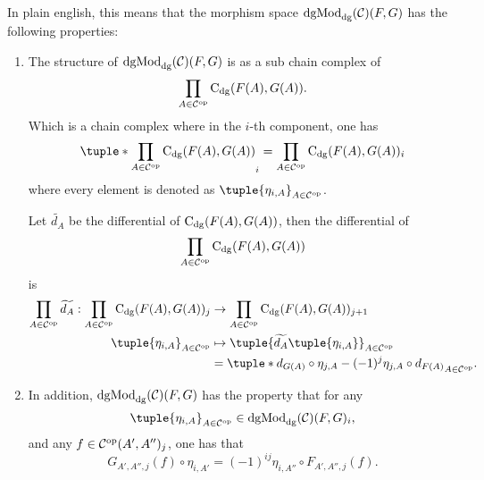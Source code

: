 In plain english, this means that the morphism space \( \operatorname{dgMod}_{\operatorname{dg}}({\mathcal{C}})(F, G) \) has the following properties:
\begin{enumerate}
    \item {
        The structure of \( \operatorname{dgMod}_{\operatorname{dg}}({\mathcal{C}})(F, G) \) is as a sub chain complex of
        \[
            \prod_{A \in {\mathcal{C}}^{\operatorname{op}}} \operatorname{C}_{\operatorname{dg}}(F(A), G(A)).
        \]
        Which is a chain complex where in the \( i \)-th component, one has
        \[
            \tuple*{ \prod_{A \in \Cc^{\op}} \C_{\dg}(F(A), G(A)) }_i = \prod_{A \in \Cc^{\op}} \C_{\dg}(F(A), G(A))_i
        \]
        where every element is denoted as \( \tuple{ \eta_{i, A} }_{A \in \Cc^{\op}} \).

        Let \( \widetilde{d_A} \) be the differential of \( \operatorname{C}_{\operatorname{dg}}(F(A), G(A)) \), then the differential of
        \[
            \prod_{A \in {\mathcal{C}}^{\operatorname{op}}} \operatorname{C}_{\operatorname{dg}}(F(A), G(A))
        \]
        is
        \begin{align*}
            \prod_{A \in \Cc^{\op}} \widetilde{d_A} : \prod_{A \in \Cc^{\op}} \C_{\dg}(F(A), G(A))_j &\to \prod_{A \in \Cc^{\op}} \C_{\dg}(F(A), G(A))_{j + 1} \\
            \tuple{ \eta_{i, A} }_{A \in \Cc^{\op}} &\mapsto \tuple{ \widetilde{d_A}\tuple{ \eta_{i, A} } }_{A \in \Cc^{\op}} \\
            &= \tuple*{ d_{G(A)} \circ \eta_{j, A} - (-1)^j \eta_{j, A} \circ d_{F(A)} }_{A \in \Cc^{\op}}.
        \end{align*}
    }
    \item {
        In addition, \( \operatorname{dgMod}_{\operatorname{dg}}({\mathcal{C}})(F, G) \) has the property that for any
        \[
            \tuple{ \eta_{i, A} }_{A \in \Cc^{\op}} \in \dgMod_{\dg}(\Cc)(F, G)_i,
        \]
        and any \( f \in {\mathcal{C}}^{\operatorname{op}}(A', A'')_j \), one has that
        \[
            G_{A', A'', j}(f) \circ \eta_{i, A'} = (-1)^{ij} \eta_{i, A''} \circ F_{A', A'', j}(f).
        \]
    }
\end{enumerate}

